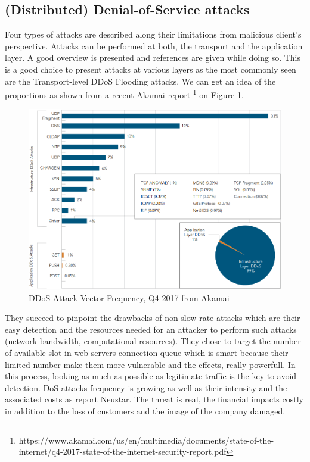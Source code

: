 \documentclass[11pt, a4paper]{article}
\begin{document}
\subsection{(Distributed) Denial-of-Service attacks}

Four types of attacks are described along their limitations from malicious client's perspective.
Attacks can be performed at both, the transport and the application layer.
A good overview is presented and references are given while doing so.
This is a good choice to present attacks at various layers as the most commonly seen are the Transport-level DDoS Flooding attacks.
We can get an idea of the proportions as shown from a recent Akamai report \footnote{https://www.akamai.com/us/en/multimedia/documents/state-of-the-internet/q4-2017-state-of-the-internet-security-report.pdf} on Figure \ref{fig:akamai}.
\begin{figure}[ht]
	\includegraphics[scale=0.40]{images/akamai2017DDoSAttackVectorFrequency.png}
	\caption{DDoS Attack Vector Frequency, Q4 2017 from Akamai}
	\label{fig:akamai}
\end{figure}
They succeed to pinpoint the drawbacks of non-slow rate attacks which are their easy detection and the resources needed for an attacker to perform such attacks (network bandwidth, computational resources).
They chose to target the number of available slot in web servers connection queue which is smart because their limited number make them more vulnerable and the effects, really powerfull.
In this process, looking as much as possible as legitimate traffic is the key to avoid detection.
DoS attacks frequency is growing as well as their intensity and the associated costs as report Neustar\cite{Neustar:report}.
The threat is real, the financial impacts costly in addition to the loss of customers and the image of the company damaged.
\end{document}
